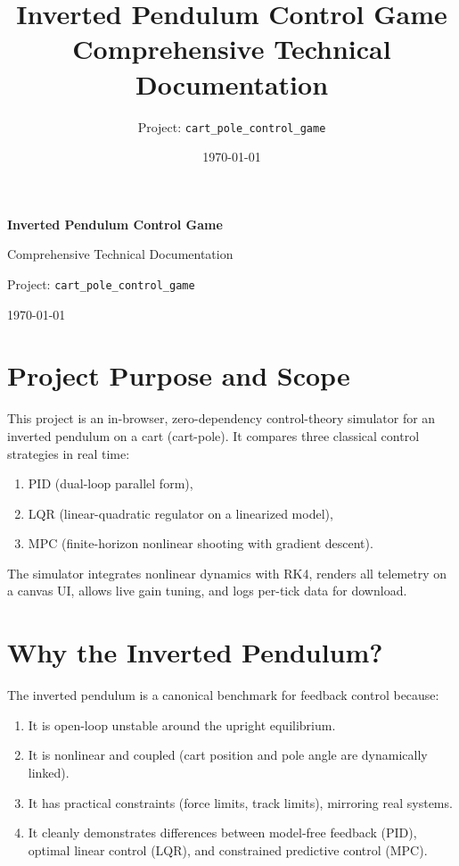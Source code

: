\documentclass[11pt,a4paper]{article}
\title{\textbf{Inverted Pendulum Control Game}\\Comprehensive Technical Documentation}
\author{Project: \texttt{cart\_pole\_control\_game}}
\date{\today}
\begin{document}
\begin{titlepage}
  \centering
  \vspace*{\fill}
  {\LARGE\bfseries Inverted Pendulum Control Game\par}
  \vspace{0.8em}
  {\Large Comprehensive Technical Documentation\par}
  \vspace{1.8em}
  {\large Project: \texttt{cart\_pole\_control\_game}\par}
  \vspace{0.8em}
  {\large \today\par}
  \vspace*{\fill}
\end{titlepage}
\clearpage
{}
\setcounter{page}{3}
\tableofcontents
\clearpage

\section{Project Purpose and Scope}
This project is an in-browser, zero-dependency control-theory simulator for an inverted pendulum on a cart (cart-pole). It compares three classical control strategies in real time:
\begin{enumerate}[label=\arabic*.]
  \item PID (dual-loop parallel form),
  \item LQR (linear-quadratic regulator on a linearized model),
  \item MPC (finite-horizon nonlinear shooting with gradient descent).
\end{enumerate}

The simulator integrates nonlinear dynamics with RK4, renders all telemetry on a canvas UI, allows live gain tuning, and logs per-tick data for download.

\section{Why the Inverted Pendulum?}
The inverted pendulum is a canonical benchmark for feedback control because:
\begin{enumerate}[label=\arabic*.]
  \item It is open-loop unstable around the upright equilibrium.
  \item It is nonlinear and coupled (cart position and pole angle are dynamically linked).
  \item It has practical constraints (force limits, track limits), mirroring real systems.
  \item It cleanly demonstrates differences between model-free feedback (PID), optimal linear control (LQR), and constrained predictive control (MPC).
\end{enumerate}
\end{document}

